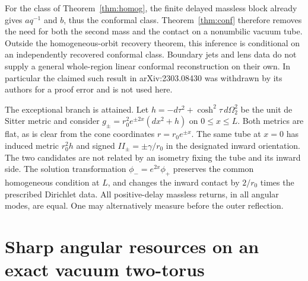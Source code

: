 \documentclass[11pt]{article}
\begin{document}
For the class of Theorem~\ref{thm:homog}, the finite delayed massless block already gives \(a q^{-1}\) and \(b\), thus the conformal class. Theorem~\ref{thm:conf} therefore removes the need for both the second mass and the contact on a nonumbilic vacuum tube. Outside the homogeneous-orbit recovery theorem, this inference is conditional on an independently recovered conformal class. Boundary jets and lens data \cite{StefanovYang} do not supply a general whole-region linear conformal reconstruction on their own. In particular the claimed such result in arXiv:2303.08430 was withdrawn by its authors for a proof error and is not used here.

The exceptional branch is attained. Let \(h=-d\tau^2+\cosh^2\tau\,d\Omega_2^2\) be the unit de Sitter metric and consider \(g_\pm=r_0^2 e^{\pm2x}(dx^2+h)\) on \(0\le x\le L\). Both metrics are flat, as is clear from the cone coordinates \(r=r_0e^{\pm x}\). The same tube at \(x=0\) has induced metric \(r_0^2h\) and signed \(II_\pm=\pm\gamma/r_0\) in the designated inward orientation. The two candidates are not related by an isometry fixing the tube and its inward side. The solution transformation \(\phi_-=e^{2x}\phi_+\) preserves the common homogeneous condition at \(L\), and changes the inward contact by \(2/r_0\) times the prescribed Dirichlet data. All positive-delay massless returns, in all angular modes, are equal. One may alternatively measure before the outer reflection.

\section{Sharp angular resources on an exact vacuum two-torus}
\end{document}
